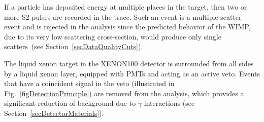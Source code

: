 If a particle has deposited energy at multiple places in the target, then two or more S2 pulses are recorded in the trace. Such an event is a multiple scatter event and is rejected in the analysis since the predicted behavior of the WIMP, due to its very low scattering cross-section, would produce only single scatters~(see Section~\ref{secDataQualityCuts}).

The liquid xenon target in the XENON100 detector is surrounded from all sides by a liquid xenon layer, equipped with PMTs and acting as an active veto. Events that have a coincident signal in the veto (illustrated in Fig.~\ref{figDetectionPrinciple}) are removed from the analysis, which provides a significant reduction of background due to $\gamma$-interactions (see Section~\ref{secDetectorMaterials}).



